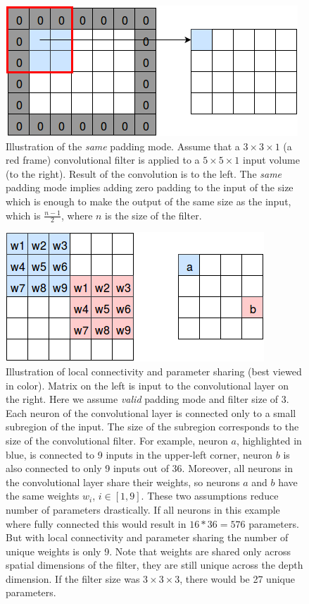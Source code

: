 \documentclass[a4paper, 11pt, table]{article}
\begin{document}
\begin{figure}[H]
\centering
\includegraphics[scale=0.7]{padding_same.png} 
\caption{Illustration of the \textit{same} padding mode. Assume that a $3 \times 3 \times 1$ (a red frame) convolutional filter is applied to a $5 \times 5 \times 1$ input volume (to the right). Result of the convolution is to the left. The \textit{same} padding mode implies adding zero padding to the input of the size which is enough to make the output of the same size as the input, which is $\frac{n-1}{2}$, where $n$ is the size of the filter.} 
\label{fig:padding_same}
\end{figure}

\begin{figure}[H]
\centering
\includegraphics[scale=0.7]{local_connectivity_parameter_sharing.png} 
\caption{Illustration of local connectivity and parameter sharing (best viewed in color). Matrix on the left is input to the convolutional layer on the right. Here we assume \textit{valid} padding mode and filter size of 3. Each neuron of the convolutional layer is connected only to a small subregion of the input. The size of the subregion corresponds to the size of the convolutional filter. For example, neuron $a$, highlighted in blue, is connected to 9 inputs in the upper-left corner, neuron $b$ is also connected to only 9 inputs out of 36. Moreover, all neurons in the convolutional layer share their weights, so neurons $a$ and $b$ have the same weights $w_i$, $i \in [1, 9]$. These two assumptions reduce number of parameters drastically. If all neurons in this example where fully connected this would result in $16 * 36 = 576$ parameters. But with local connectivity and parameter sharing the number of unique weights is only 9. Note that weights are shared only across spatial dimensions of the filter, they are still unique across the depth dimension. If the filter size was $3 \times 3 \times 3$, there would be 27 unique parameters.}
\label{fig:local_connectivity}
\end{figure}
\end{document}
